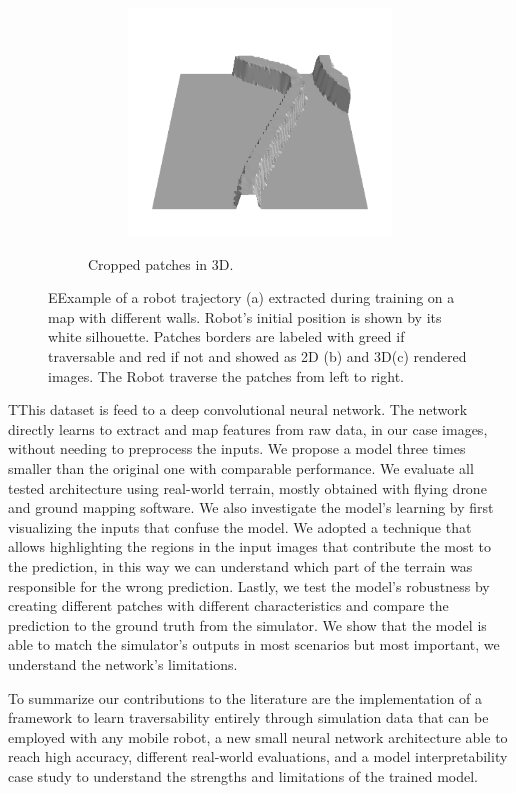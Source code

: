 \documentclass[../document.tex]{subfiles}
\begin{document}
\begin{figure}[H]
\begin{subfigure}[b]{1\textwidth}
\begin{subfigure}[b]{0.19\textwidth}
    \includegraphics[width=\linewidth]{../img/bars1-example-patches/3d/14.png}    
    \end{subfigure}  
\caption{Cropped patches in 3D.}
\label{fig : patch-extraction}
\end{subfigure}
\caption{EExample of a robot trajectory (a) extracted during training on a map with different walls. Robot's initial position is shown by its white silhouette. Patches borders are labeled with greed if traversable and red if not and showed as 2D (b) and 3D(c) rendered images. The Robot traverse the patches from left to right.}
\end{figure}

TThis dataset is feed to a deep convolutional neural network. The network directly learns to extract and map features from raw data, in our case images, without needing to preprocess the inputs. We propose a model three times smaller than the original one with comparable performance. We evaluate all tested architecture using real-world terrain, mostly obtained with flying drone and ground mapping software. 
We also investigate the model's learning by first visualizing the inputs that confuse the model. We adopted a technique that allows highlighting the regions in the input images that contribute the most to the prediction, in this way we can understand which part of the terrain was responsible for the wrong prediction. Lastly, we test the model's robustness by creating different patches with different characteristics and compare the prediction to the ground truth from the simulator. We show that the model is able to match the simulator's outputs in most scenarios but most important, we understand the network's limitations.

To summarize our contributions to the literature are the implementation of a framework to learn traversability entirely through simulation data that can be employed with any mobile robot, a new small neural network architecture able to reach high accuracy, different real-world evaluations, and a model interpretability case study to understand the strengths and limitations of the trained model. 
\end{document}
